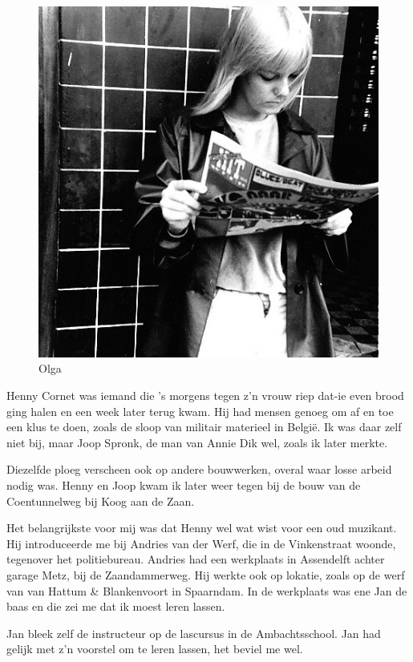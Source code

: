 \documentclass[10pt,twoside, openright]{memoir}
\begin{document}
\begin{figure}
\includegraphics[width=\textwidth]{img/ch38/olga}
\caption*{\footnotesize Olga}
\end{figure}

Henny Cornet was iemand die ’s morgens tegen z’n vrouw riep dat-ie even brood ging halen en een week later terug kwam. Hij had mensen genoeg om af en toe een klus te doen, zoals de sloop van militair materieel in België. Ik was daar zelf niet bij, maar Joop Spronk, de man van Annie Dik wel, zoals ik later merkte. 

Diezelfde ploeg verscheen ook op andere bouwwerken, overal waar losse arbeid nodig was. Henny en Joop kwam ik later weer tegen bij de bouw van de Coentunnelweg bij Koog aan de Zaan. 

Het belangrijkste voor mij was dat Henny wel wat wist voor een oud muzikant. Hij introduceerde me bij Andries van der Werf, die in de Vinkenstraat woonde, tegenover het politiebureau. Andries had een werkplaats in Assendelft achter garage Metz, bij de Zaandammerweg. Hij werkte ook op lokatie, zoals op de werf van van Hattum \& Blankenvoort in Spaarndam. In de werkplaats was ene Jan de baas en die zei me dat ik moest leren lassen. 

Jan bleek zelf de instructeur op de lascursus in de Ambachtsschool. Jan had gelijk met z’n voorstel om te leren lassen, het beviel me wel.
\end{document}
